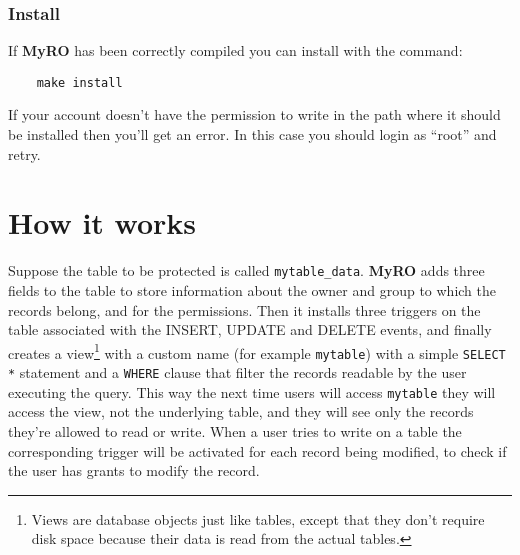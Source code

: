 \documentclass[12pt,titlepage]{article}
\newcommand{\myro}{\textbf{MyRO} }
\begin{document}
\subsubsection{Install}
\label{sec:installmyro}
If \myro has been correctly compiled you can install with the command:
%
\begin{verbatim}
    make install
\end{verbatim}
%
If your account doesn't have the permission to write in the path where
it should be installed then you'll get an error. In this case you
should login as ``root'' and retry.


\newpage
\section{How it works}
Suppose the table to be protected is called \verb|mytable_data|. \myro
adds three fields to the table to store information about the owner
and group to which the records belong, and for the permissions. Then
it installs three triggers on the table associated with the INSERT,
UPDATE and DELETE events, and finally creates a view\footnote{Views
  are database objects just like tables, except that they don't
  require disk space because their data is read from the actual tables.}
with a custom name (for example \verb|mytable|) with a simple \verb|SELECT *|
statement and a \verb|WHERE| clause that filter the records readable by the
user executing the query. This way the next time users will access
\verb|mytable| they will access the view, not the underlying table,
and they will see only the records they're allowed to read or write.
When a user tries to write on a table the corresponding trigger will
be activated for each record being modified, to check if the user has
grants to modify the record.

%
\end{document}

